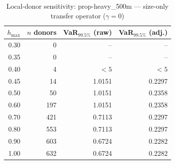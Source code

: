 \begin{table}[htbp]
\centering
\caption{Local-donor sensitivity: prop-heavy_500m --- size-only transfer operator ($\gamma=0$)}
\label{tab:local_donor_prop-heavy_500m}
\begin{tabular}{rrrr}
\toprule
\textbf{$h_{\max}$} & \textbf{$n$ donors} & \textbf{VaR$_{99.5\%}$ (raw)} & \textbf{VaR$_{99.5\%}$ (adj.)} \\
\midrule
0.30 & 0 & -- & -- \\
0.35 & 0 & -- & -- \\
0.40 & 4 & $<5$ & $<5$ \\
0.45 & 14 & 1.0151 & 0.2297 \\
0.50 & 50 & 1.0151 & 0.2358 \\
0.60 & 197 & 1.0151 & 0.2358 \\
0.70 & 421 & 0.7113 & 0.2297 \\
0.80 & 553 & 0.7113 & 0.2297 \\
0.90 & 603 & 0.6724 & 0.2282 \\
1.00 & 632 & 0.6724 & 0.2282 \\
\bottomrule
\end{tabular}
\end{table}
